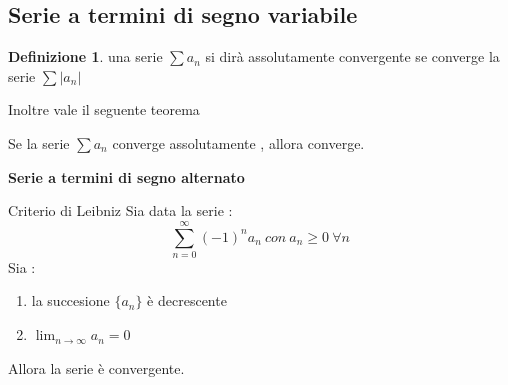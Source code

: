 \documentclass{article}
\theoremstyle{definition}
\newtheorem*{definizione}{Definizione}
\begin{document}
\subsection{Serie a termini di segno variabile}
\begin{definizione}
	una serie $\sum a_n$ si dirà assolutamente convergente se converge la serie $\sum | a_n|$ 
\end{definizione}
Inoltre vale il seguente teorema
\begin{teo}{}{}
	Se la serie $\sum a_n$ converge assolutamente , allora converge.
\end{teo}
\newpage
\textbf{Serie a termini di segno alternato }
\begin{teo}{Criterio di Leibniz}{}
	Sia data la serie : 
	$$\sum_{n=0}^{\infty} (-1)^na_n \ con \ a_n \geq 0\ \forall n$$
	Sia : 
	\begin{enumerate}
		\item la succesione $\{a_n\}$ è decrescente 
		\item $\lim_{n\rightarrow\infty} a_n=0$
	\end{enumerate}
	Allora la serie è convergente.
\end{teo}
\end{document}
